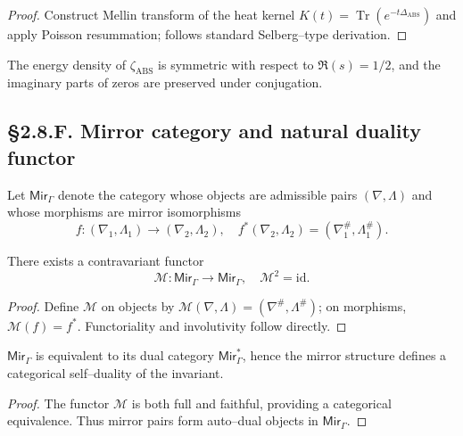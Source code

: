 \begin{proof}
Construct Mellin transform of the heat kernel $K(t)=\operatorname{Tr}(e^{-t\Delta_{\mathrm{ABS}}})$ and apply Poisson resummation; follows standard Selberg–type derivation.
\end{proof}

\begin{corollary}
The energy density of $\zeta_{\mathrm{ABS}}$ is symmetric with respect to $\Re(s)=1/2$, and the imaginary parts of zeros are preserved under conjugation.
\end{corollary}

\subsection*{§2.8.F. Mirror category and natural duality functor}

\begin{definition}
Let $\mathsf{Mir}_\Gamma$ denote the category whose objects are admissible pairs $(\nabla,\Lambda)$ and whose morphisms are mirror isomorphisms
\[
f:(\nabla_1,\Lambda_1)\to(\nabla_2,\Lambda_2),\quad
f^\ast(\nabla_2,\Lambda_2)=(\nabla_1^\#,\Lambda_1^\#).
\]
\]
\end{definition}

\begin{lemma}
There exists a contravariant functor
\[
\mathcal{M}:\mathsf{Mir}_\Gamma \to \mathsf{Mir}_\Gamma,
\quad
\mathcal{M}^2=\mathrm{id}.
\]
\]
\end{lemma}

\begin{proof}
Define $\mathcal{M}$ on objects by $\mathcal{M}(\nabla,\Lambda)=(\nabla^\#,\Lambda^\#)$;  
on morphisms, $\mathcal{M}(f)=f^\ast$.  
Functoriality and involutivity follow directly.
\end{proof}

\begin{theorem}\label{thm:2.8.categorical}
$\mathsf{Mir}_\Gamma$ is equivalent to its dual category $\mathsf{Mir}_\Gamma^\ast$,  
hence the mirror structure defines a categorical self–duality of the invariant.
\end{theorem}

\begin{proof}
The functor $\mathcal{M}$ is both full and faithful, providing a categorical equivalence.  
Thus mirror pairs form auto–dual objects in $\mathsf{Mir}_\Gamma$.
\end{proof}

